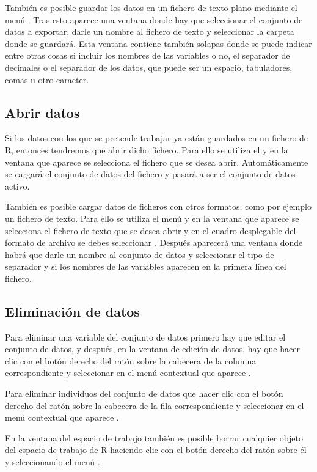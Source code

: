 También es posible guardar los datos en un fichero de texto plano mediante el menú .
Tras esto aparece una ventana donde hay que seleccionar el conjunto de datos a exportar, darle un nombre al fichero de
texto y seleccionar la carpeta donde se guardará.
Esta ventana contiene también solapas donde se puede indicar entre otras cosas si incluir los nombres de las variables o
no, el separador de decimales o el separador de los datos, que puede ser un espacio, tabuladores, comas u otro caracter.


\subsection{Abrir datos}
Si los datos con los que se pretende trabajar ya están guardados en un fichero de R, entonces tendremos que abrir dicho
fichero. Para ello se utiliza el  y en la ventana que aparece
se selecciona el fichero que se desea abrir.
Automáticamente se cargará el conjunto de datos del fichero y pasará a ser el conjunto de datos activo.

También es posible cargar datos de ficheros con otros formatos, como por ejemplo un fichero de texto.
Para ello se utiliza el menú  y en la ventana que aparece se
selecciona el fichero de texto que se desea abrir y en el cuadro desplegable del formato de archivo se debes seleccionar
.
Después aparecerá una ventana donde habrá que darle un nombre al conjunto de datos y seleccionar el tipo de separador y
si los nombres de las variables aparecen en la primera línea del fichero.


\subsection{Eliminación de datos}
Para eliminar una variable del conjunto de datos primero hay que editar el conjunto de datos, y después, en la ventana
de edición de datos, hay que hacer clic con el botón derecho del ratón sobre la cabecera de la columna correspondiente
y seleccionar en el menú contextual que aparece .

Para eliminar individuos del conjunto de datos que hacer clic con el botón derecho del ratón sobre la cabecera de la
fila correspondiente y seleccionar en el menú contextual que aparece .

En la ventana del espacio de trabajo también es posible borrar cualquier objeto del espacio de trabajo de R haciendo
clic con el botón derecho del ratón sobre él y seleccionando el menú .


